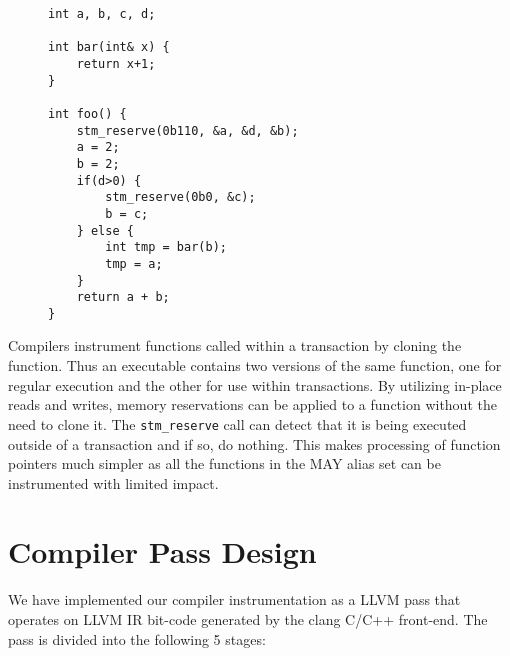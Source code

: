 \documentclass[preprint]{sigplanconf}
\begin{document}
\begin{figure}[h]
    \begin{lstlisting}[caption={Reducing redundant memory reservations},label=listing4,captionpos=b]
int a, b, c, d;

int bar(int& x) {
    return x+1;
}

int foo() {
    stm_reserve(0b110, &a, &d, &b);
    a = 2;
    b = 2;
    if(d>0) {
        stm_reserve(0b0, &c);
        b = c;
    } else {
        int tmp = bar(b);
        tmp = a;
    }
    return a + b;
}
\end{lstlisting}
\end{figure}

Compilers instrument functions called within a transaction by cloning the function. Thus an executable contains two versions of the same function, one for regular execution and the other for use within transactions. By utilizing in-place reads and writes, memory reservations can be applied to a function without the need to clone it. The \verb+stm_reserve+ call can detect that it is being executed outside of a transaction and if so, do nothing. This makes processing of function pointers much simpler as all the functions in the MAY alias set can be instrumented with limited impact.

\section{Compiler Pass Design}

We have implemented our compiler instrumentation as a LLVM\cite{1281665} pass that operates on LLVM IR bit-code generated by the clang C/C++ front-end. The pass is divided into the following 5 stages:
\end{document}
